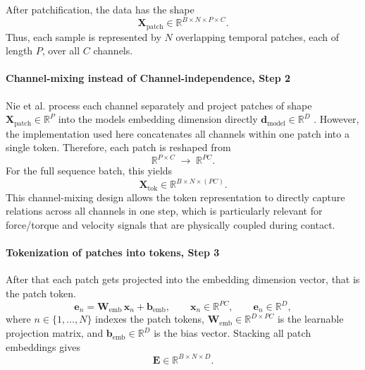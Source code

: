 After patchification, the data has the shape
\begin{equation}
\mathbf{X}_{\text{patch}} \in \mathbb{R}^{B \times N \times P \times C}.
\end{equation}
Thus, each sample is represented by $N$ overlapping temporal patches, each of length $P$, over all $C$ channels.

\paragraph{Channel-mixing instead of Channel-independence,  Step 2}
Nie et al. process each channel separately and project patches of shape $\mathbf{X}_{\text{patch}} \in \mathbb{R}^P$ into the models embedding dimension directly $\mathbf{d}_{\text{model}} \in \mathbb{R}^D$ \cite{nieTimeSeriesWorth2023b}. However, the implementation used here concatenates all channels within one patch into a single token. Therefore, each patch is reshaped from
\begin{equation}
\mathbb{R}^{P \times C}
\;\rightarrow\;
\mathbb{R}^{P C}.
\end{equation}
For the full sequence batch, this yields
\begin{equation}
\mathbf{X}_{\text{tok}} \in \mathbb{R}^{B \times N \times (P C)}.
\end{equation}
This channel-mixing design allows the token representation to directly capture relations across all channels in one step, which is particularly relevant for force/torque and velocity signals that are physically coupled during contact.

\paragraph{Tokenization of patches into tokens,  Step 3}
After that each patch gets projected into the embedding dimension vector, that is the patch token.
\begin{equation}
\mathbf{e}_n = \mathbf{W}_{\text{emb}}\,\mathbf{x}_n + \mathbf{b}_{\text{emb}},
\qquad
\mathbf{x}_n \in \mathbb{R}^{PC},
\qquad
\mathbf{e}_n \in \mathbb{R}^{D},
\end{equation}
where $n \in \{1,\dots,N\}$ indexes the patch tokens, $\mathbf{W}_{\text{emb}} \in \mathbb{R}^{D \times PC}$ is the learnable projection matrix, and $\mathbf{b}_{\text{emb}} \in \mathbb{R}^{D}$ is the bias vector.
Stacking all patch embeddings gives
\begin{equation}
\mathbf{E} \in \mathbb{R}^{B \times N \times D}.
\end{equation}

